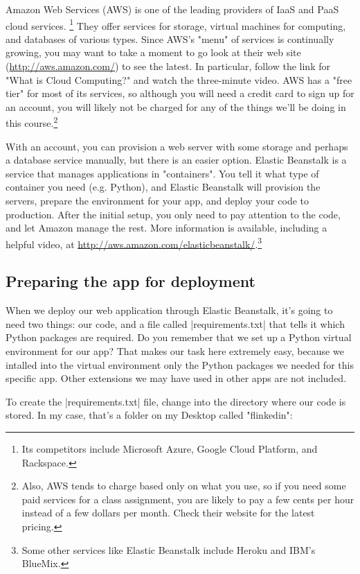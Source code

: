 \documentclass[11pt]{book}
\begin{document}
Amazon Web Services (AWS) is one of the leading providers of IaaS and PaaS cloud services.  \footnote{Its competitors include Microsoft Azure, Google Cloud Platform, and Rackspace.}  They offer services for storage, virtual machines for computing, and databases of various types.  Since AWS's "menu" of services is continually growing, you may want to take a moment to go look at their web site (\url{http://aws.amazon.com/}) to see the latest.  In particular, follow the link for "What is Cloud Computing?" and watch the three-minute video.  AWS has a "free tier" for most of its services, so although you will need a credit card to sign up for an account, you will likely not be charged for any of the things we'll be doing in this course.\footnote{Also, AWS tends to charge based only on what you use, so if you need some paid services for a class assignment, you are likely to pay a few cents per hour instead of a few dollars per month. Check their website for the latest pricing.}

With an account, you can provision a web server with some storage and perhaps a database service manually, but there is an easier option.  Elastic Beanstalk is a service that manages applications in "containers".  You tell it what type of container you need (e.g. Python), and Elastic Beanstalk will provision the servers, prepare the environment for your app, and deploy your code to production.  After the initial setup, you only need to pay attention to the code, and let Amazon manage the rest.  More information is available, including a helpful video, at \url{http://aws.amazon.com/elasticbeanstalk/}.\footnote{Some other services like Elastic Beanstalk include Heroku and IBM's BlueMix.}

\subsection*{Preparing the app for deployment}

When we deploy our web application through Elastic Beanstalk, it's going to need two things: our code, and a file called |requirements.txt| that tells it which Python packages are required.  Do you remember that we set up a Python virtual environment for our app?  That makes our task here extremely easy, because we intalled into the virtual environment only the Python packages we needed for this specific app.  Other extensions we may have used in other apps are not included.

To create the |requirements.txt| file, change into the directory where our code is stored.  In my case, that's a folder on my Desktop called "flinkedin":
\end{document}
